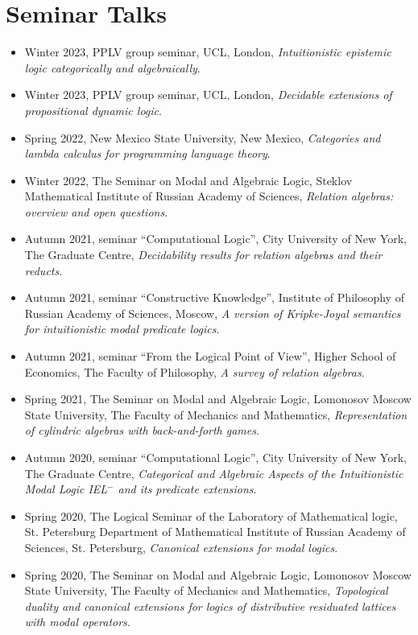 \documentclass[11pt,a4paper]{article}
\begin{document}
\section{Seminar Talks}

\begin{itemize}[leftmargin=*]
    \item Winter 2023, PPLV group seminar, UCL, London, \textit{Intuitionistic epistemic logic categorically and algebraically}.
    \item Winter 2023, PPLV group seminar, UCL, London, \textit{Decidable extensions of propositional dynamic logic}.
    \item Spring 2022, New Mexico State University, New Mexico, \textit{Categories and lambda calculus for programming language theory}.
    \item Winter 2022, The Seminar on Modal and Algebraic Logic, Steklov Mathematical Institute of Russian Academy of Sciences, \textit{Relation algebras: overview and open questions}.
    \item Autumn 2021, seminar ``Computational Logic'', City University of New York, The Graduate Centre, \textit{Decidability results for relation algebras and their reducts}.
    \item Autumn 2021, seminar ``Constructive Knowledge'', Institute of Philosophy of Russian Academy of Sciences, Moscow, \textit{A version of Kripke-Joyal semantics for intuitionistic modal predicate logics}.
    \item Autumn 2021, seminar ``From the Logical Point of View'', Higher School of Economics, The Faculty of Philosophy, \textit{A survey of relation algebras}.
    \item Spring 2021, The Seminar on Modal and Algebraic Logic, Lomonosov Moscow State University, The Faculty of Mechanics and Mathematics, \textit{Representation of cylindric algebras with back-and-forth games}.
    \item Autumn 2020, seminar ``Computational Logic'', City University of New York, The Graduate Centre, \textit{Categorical and Algebraic Aspects of the Intuitionistic Modal Logic IEL$^-$ and its predicate extensions}.
    \item Spring 2020, The Logical Seminar of the Laboratory of Mathematical logic, St. Petersburg Department of Mathematical Institute of Russian Academy of Sciences, St. Petersburg, \textit{Canonical extensions for modal logics}.
    \item Spring 2020, The Seminar on Modal and Algebraic Logic, Lomonosov Moscow State University, The Faculty of Mechanics and Mathematics, \textit{Topological duality and canonical extensions for logics of distributive residuated lattices with modal operators}.

\end{itemize}
\end{document}
